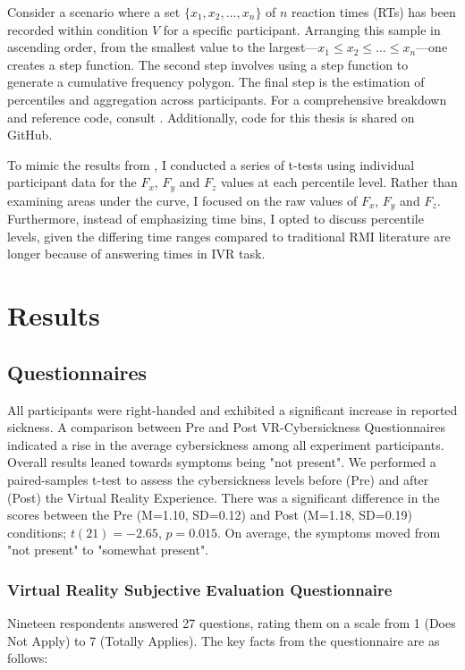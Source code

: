 \documentclass[12pt,oneside,openright]{report}
\begin{document}
Consider a scenario where a set $\{x_1, x_2, \ldots , x_n\}$ of $n$ reaction times (RTs) has been recorded within condition $V$ for a specific participant. Arranging this sample in ascending order, from the smallest value to the largest—$x_1 \leq x_2 \leq \ldots \leq x_n$—one creates a step function. The second step involves using a step function to generate a cumulative frequency polygon. The final step is the estimation of percentiles and aggregation across participants. For a comprehensive breakdown and reference code, consult \cite{Ulrich2007}. Additionally, code for this thesis is shared on GitHub.

To mimic the results from \Cite{SALTAFOSSI2023108642}, I conducted a series of t-tests using individual participant data for the $F_x$, $F_y$ and $F_z$ values at each percentile level. Rather than examining areas under the curve, I focused on the raw values of $F_x$, $F_y$ and $F_z$. Furthermore, instead of emphasizing time bins, I opted to discuss percentile levels, given the differing time ranges compared to traditional RMI literature are longer because of answering times in IVR task.

\section*{Results}
\subsection*{Questionnaires}
 
All participants were right-handed and exhibited a significant increase in reported sickness. A comparison between Pre and Post VR-Cybersickness Questionnaires indicated a rise in the average cybersickness among all experiment participants. Overall results leaned towards symptoms being "not present". We performed a paired-samples t-test to assess the cybersickness levels before (Pre) and after (Post) the Virtual Reality Experience. There was a significant difference in the scores between the Pre (M=1.10, SD=0.12) and Post (M=1.18, SD=0.19) conditions; $t(21)=-2.65$, $p = 0.015$. On average, the symptoms moved from "not present" to "somewhat present". 

\subsubsection*{Virtual Reality Subjective Evaluation Questionnaire}
Nineteen respondents answered 27 questions, rating them on a scale from 1 (Does Not Apply) to 7 (Totally Applies). The key facts from the questionnaire are as follows:
    
\end{document}

